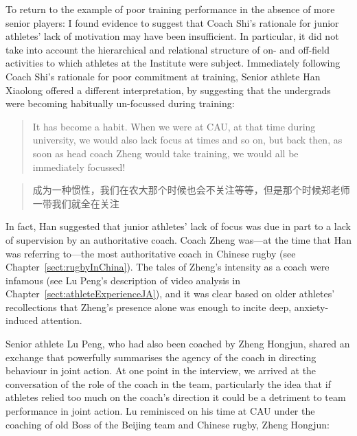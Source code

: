 \begin{CJK}{UTF8}{gbsn}
To return to the example of poor training performance in the absence of more senior players: I found evidence to suggest that Coach Shi's rationale for junior athletes' lack of motivation may have been insufficient.  In particular, it did not take into account the hierarchical and relational structure of on- and off-field activities to which athletes at the Institute were subject.  Immediately following Coach Shi's rationale for poor commitment at training, Senior athlete Han Xiaolong offered a different interpretation, by suggesting that the undergrads were becoming habitually un-focussed during training:
     \begin{quote}
       It has become a habit.  When we were at CAU, at that time during university, we would also lack focus at times and so on, but back then, as soon as head coach Zheng would take training, we would all be immediately focussed!
      \end{quote}
      \begin{quote}
       成为一种惯性，我们在农大那个时候也会不关注等等，但是那个时候郑老师一带我们就全在关注
      \end{quote}

In fact, Han suggested that junior athletes' lack of focus was due in part to a lack of supervision by an authoritative coach.  Coach Zheng was---at the time that Han was referring to---the most authoritative coach in Chinese rugby (see Chapter~\ref{sect:rugbyInChina}).  The tales of Zheng's intensity as a coach were infamous (see Lu Peng's description of video analysis in Chapter~\ref{sect:athleteExperienceJA}), and it was clear based on older athletes' recollections that Zheng's presence alone was enough to incite deep, anxiety-induced attention.

Senior athlete Lu Peng, who had also been coached by Zheng Hongjun, shared an exchange that powerfully summarises the agency of the coach in directing behaviour in joint action.  At one point in the interview, we arrived at the conversation of the role of the coach in the team, particularly the idea that if athletes relied too much on the coach's direction it could be a detriment to team performance in joint action.  Lu reminisced on his time at CAU under the coaching of old Boss of the Beijing team and Chinese rugby, Zheng Hongjun:


\end{CJK}
